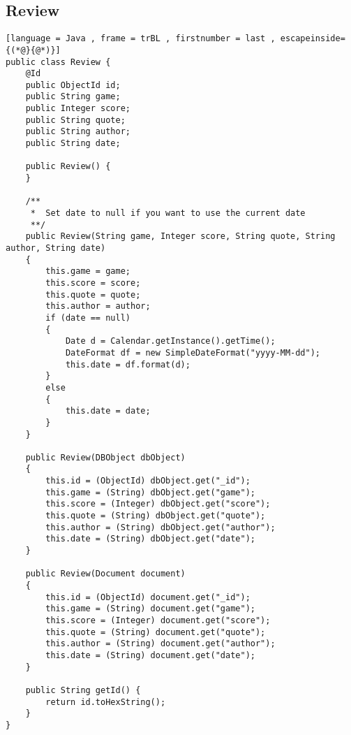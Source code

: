 \subsection{Review}
\begin{lstlisting}[language = Java , frame = trBL , firstnumber = last , escapeinside={(*@}{@*)}]
public class Review {
    @Id
    public ObjectId id;
    public String game;
    public Integer score;
    public String quote;
    public String author;
    public String date;

    public Review() {
    }

    /**
     *  Set date to null if you want to use the current date
     **/
    public Review(String game, Integer score, String quote, String author, String date)
    {
        this.game = game;
        this.score = score;
        this.quote = quote;
        this.author = author;
        if (date == null)
        {
            Date d = Calendar.getInstance().getTime();
            DateFormat df = new SimpleDateFormat("yyyy-MM-dd");
            this.date = df.format(d);
        }
        else
        {
            this.date = date;
        }
    }

    public Review(DBObject dbObject)
    {
        this.id = (ObjectId) dbObject.get("_id");
        this.game = (String) dbObject.get("game");
        this.score = (Integer) dbObject.get("score");
        this.quote = (String) dbObject.get("quote");
        this.author = (String) dbObject.get("author");
        this.date = (String) dbObject.get("date");
    }

    public Review(Document document)
    {
        this.id = (ObjectId) document.get("_id");
        this.game = (String) document.get("game");
        this.score = (Integer) document.get("score");
        this.quote = (String) document.get("quote");
        this.author = (String) document.get("author");
        this.date = (String) document.get("date");
    }

    public String getId() {
        return id.toHexString();
    }
}

\end{lstlisting}
